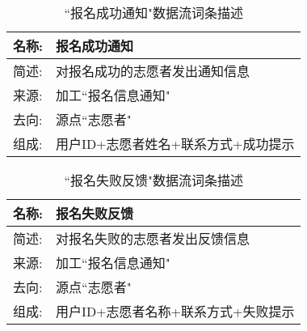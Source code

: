 \begin{table}[H]  
    \caption{``报名成功通知"数据流词条描述}  
    \begin{center}  
        \begin{tabular}{l p{11cm}} 
            \hline
            \quad 名称: & 报名成功通知 \\
            \hline
            \quad 简述: & 对报名成功的志愿者发出通知信息 \\
            \hline
            \quad 来源: & 加工``报名信息通知" \\
            \hline
            \quad 去向: & 源点``志愿者" \\
            \hline
            \quad 组成: & 用户ID+志愿者姓名+联系方式+成功提示  \\
            \hline
        \end{tabular}
        \label{tab1}
    \end{center}
    \end{table}

\begin{table}[H]  
    \caption{``报名失败反馈"数据流词条描述}  
    \begin{center}  
        \begin{tabular}{l p{11cm}} 
            \hline
            \quad 名称: & 报名失败反馈 \\
            \hline
            \quad 简述: & 对报名失败的志愿者发出反馈信息 \\
            \hline
            \quad 来源: & 加工``报名信息通知" \\
            \hline
            \quad 去向: & 源点``志愿者" \\
            \hline
            \quad 组成: & 用户ID+志愿者名称+联系方式+失败提示  \\
            \hline
        \end{tabular}
        \label{tab1}
    \end{center}
    \end{table}